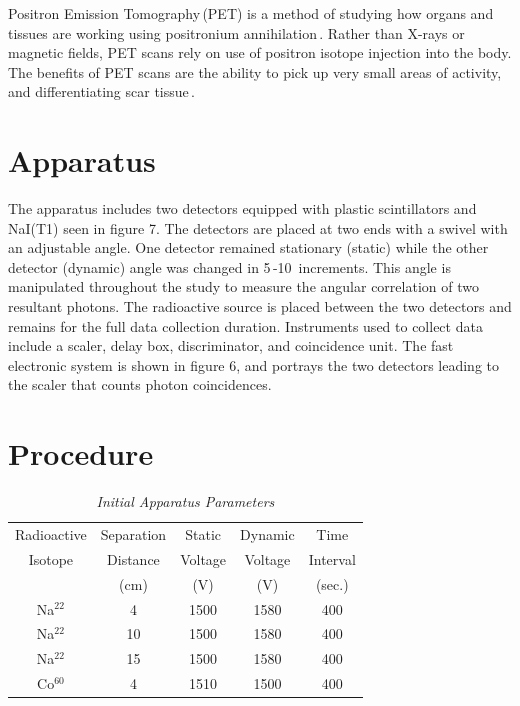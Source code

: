 \documentclass[aps,prl,twocolumn,superscriptaddress]{revtex4-1}
\begin{document}
Positron Emission Tomography\,(PET) is a method of studying how organs and tissues are working using positronium annihilation\,\cite{1}. Rather than X-rays or magnetic fields, PET scans rely on use of positron isotope injection into the body. The benefits of PET scans are the ability to pick up very small areas of activity, and differentiating scar tissue\,\cite{2}. 



\section{Apparatus}

The apparatus includes two detectors equipped with plastic scintillators and NaI(T1) seen in figure 7. The detectors are placed at two ends with a swivel with an adjustable angle. One detector remained stationary (static) while the other detector (dynamic) angle was changed in 5\degree\,-10\degree\ increments. This angle is manipulated throughout the study to measure the angular correlation of two resultant photons. The radioactive source is placed between the two detectors and remains for the full data collection duration. Instruments used to collect data include a scaler, delay box, discriminator, and coincidence unit. The fast electronic system is shown in figure 6, and portrays the two detectors leading to the scaler that counts photon coincidences.


\section{Procedure}


\begin{table}[htb!] 
\caption{\it Initial Apparatus Parameters}
\label{t1}   %
 \begin{center}   %
    \begin{tabular}{|c|c|c|c|c|} \hline   %

Radioactive & Separation & Static & Dynamic & Time \\
Isotope & Distance & Voltage & Voltage & Interval  \\
  & (cm)  & (V)  & (V)  & (sec.)   \\ \hline \hline \hline
Na$^{22}$ & 4 & 1500 & 1580 & 400 \\ \hline
Na$^{22}$ & 10 & 1500 & 1580  &  400  \\ \hline
Na$^{22}$ & 15 & 1500 & 1580  &  400  \\ \hline \hline
Co$^{60}$ & 4 & 1510 & 1500 &  400  \\ \hline   

     \end{tabular}
  \end{center}
\end{table}
\end{document}
